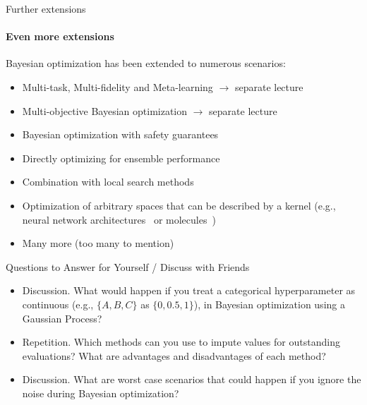\begin{frame}[c]{Further extensions}
\framesubtitle{Even more extensions}
Bayesian optimization has been extended to numerous scenarios:
\begin{itemize}
    \item Multi-task, Multi-fidelity and Meta-learning $\rightarrow$ separate lecture
    \item Multi-objective Bayesian optimization $\rightarrow$ separate lecture
    \item Bayesian optimization with safety guarantees~
    \item Directly optimizing for ensemble performance~
    \item Combination with local search methods~~
    \item Optimization of arbitrary spaces that can be described by a kernel (e.g., neural network architectures~ or 
    molecules~)
    \item Many more (too many to mention)
\end{itemize}
  
\end{frame}
\begin{frame}[c]{Questions to Answer for Yourself / Discuss with Friends}

\begin{itemize}
\item \alert{Discussion.} What would happen if you treat a categorical hyperparameter as continuous (e.g., $\{A, B, C\}$ as $\{0, 0.5, 1\}$), in Bayesian optimization using a Gaussian Process?
\medskip
\item \alert{Repetition.} Which methods can you use to impute values for outstanding evaluations? What are advantages and disadvantages of each method?
\medskip
\item \alert{Discussion.} What are worst case scenarios that could happen if you ignore the noise during Bayesian optimization?
\end{itemize}
\end{frame}

%
